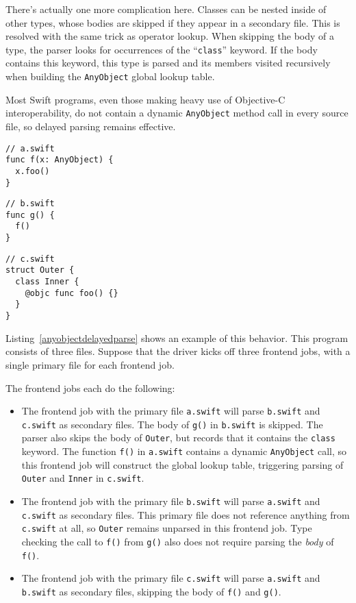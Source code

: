 \documentclass[../generics]{subfiles}
\begin{document}
There's actually one more complication here. Classes can be nested inside of other types, whose bodies are skipped if they appear in a secondary file. This is resolved with the same trick as operator lookup. When skipping the body of a type, the parser looks for occurrences of the ``\texttt{class}'' keyword. If the body contains this keyword, this type is parsed and its members visited recursively when building the \texttt{AnyObject} global lookup table.

Most Swift programs, even those making heavy use of Objective-C interoperability, do not contain a dynamic \texttt{AnyObject} method call in every source file, so delayed parsing remains effective.

\begin{listing}[b!]\label{anyobjectdelayedparse}
\begin{Verbatim}
// a.swift
func f(x: AnyObject) {
  x.foo()
}
\end{Verbatim}

\begin{Verbatim}
// b.swift
func g() {
  f()
}
\end{Verbatim}

\begin{Verbatim}
// c.swift
struct Outer {
  class Inner {
    @objc func foo() {}
  }
}
\end{Verbatim}
\end{listing}

\begin{example}\label{anyobjectdelayedparseex}
Listing~\ref{anyobjectdelayedparse} shows an example of this behavior. This program consists of three files. Suppose that the driver kicks off three frontend jobs, with a single primary file for each frontend job.

The frontend jobs each do the following:
\begin{itemize}
\item The frontend job with the primary file \texttt{a.swift} will parse \texttt{b.swift} and \texttt{c.swift} as secondary files. The body of \texttt{g()} in \texttt{b.swift} is skipped. The parser also skips the body of \texttt{Outer}, but records that it contains the \texttt{class} keyword. The function \texttt{f()} in \texttt{a.swift} contains a dynamic \texttt{AnyObject} call, so this frontend job will construct the global lookup table, triggering parsing of \texttt{Outer} and \texttt{Inner} in \texttt{c.swift}.
\item The frontend job with the primary file \texttt{b.swift} will parse \texttt{a.swift} and \texttt{c.swift} as secondary files. This primary file does not reference anything from \texttt{c.swift} at all, so \texttt{Outer} remains unparsed in this frontend job. Type checking the call to \texttt{f()} from \texttt{g()} also does not require parsing the \emph{body} of \texttt{f()}.
\item The frontend job with the primary file \texttt{c.swift} will parse \texttt{a.swift} and \texttt{b.swift} as secondary files, skipping the body of \texttt{f()} and \texttt{g()}.
\end{itemize}
\end{example}
\end{document}
